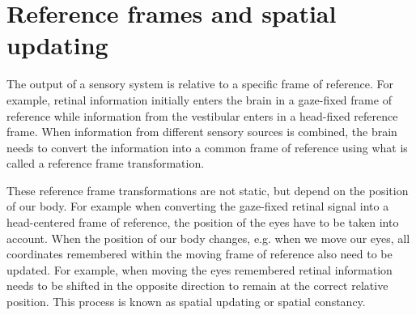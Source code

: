 




\section{Reference frames and spatial updating}
The output of a sensory system is relative to a specific frame of reference. For example, retinal information initially enters the brain in a gaze-fixed frame of reference while information from the vestibular enters in a head-fixed reference frame. When information from different sensory sources is combined, the brain needs to convert the information into a common frame of reference using what is called a reference frame transformation.

These reference frame transformations are not static, but depend on the position of our body. For example when converting the gaze-fixed retinal signal into a head-centered frame of reference, the position of the eyes have to be taken into account. When the position of our body changes, e.g. when we move our eyes, all coordinates remembered within the moving frame of reference also need to be updated. For example, when moving the eyes remembered retinal information needs to be shifted in the opposite direction to remain at the correct relative position. This process is known as spatial updating or spatial constancy.

